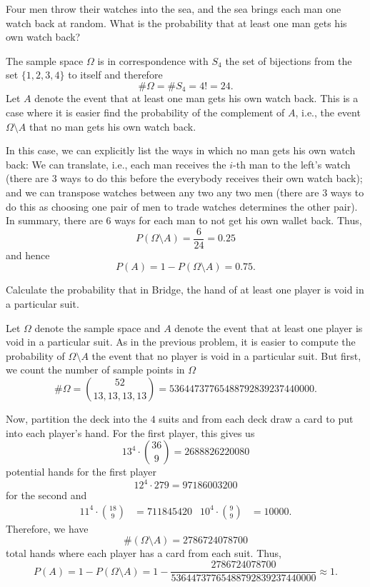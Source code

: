 \begin{problem}[Handout 2, \# 5]
  Four men throw their watches into the sea, and the sea brings each man
  one watch back at random. What is the probability that at least one man
  gets his own watch back?
\end{problem}
\begin{solution}
  The sample space \(\Omega\) is in correspondence with \(S_4\) the set of
  bijections from the set \(\{1,2,3,4\}\) to itself and therefore
  \begin{equation}
    \label{eq:2-1}
    \#\Omega=\# S_4=4!=24.
  \end{equation}
  Let \(A\) denote the event that at least one man gets his own watch
  back. This is a case where it is easier find the probability of the
  complement of \(A\), i.e., the event \(\Omega\setminus A\) that no man
  gets his own watch back.

  In this case, we can explicitly list the ways in which no man gets his
  own watch back: We can translate, i.e., each man receives the \(i\)-th
  man to the left's watch (there are \(3\) ways to do this before the
  everybody receives their own watch back); and we can transpose watches
  between any two any two men (there are \(3\) ways to do this as choosing
  one pair of men to trade watches determines the other pair). In summary,
  there are \(6\) ways for each man to not get his own wallet back. Thus,
  \[
    P(\Omega\setminus A)=\frac{6}{24}=0.25
  \]
  and hence
  \[
    P(A)=1-P(\Omega\setminus A)=0.75.
  \]
\end{solution}
\newpage

\begin{problem}[Handout 2, \#7]
  Calculate the probability that in Bridge, the hand of at least one player
  is void in a particular suit.
\end{problem}
\begin{solution}
  Let \(\Omega\) denote the sample space and \(A\) denote the event that at
  least one player is void in a particular suit. As in the previous
  problem, it is easier to compute the probability of \(\Omega\setminus A\)
  the event that no player is void in a particular suit. But first, we
  count the number of sample points in \(\Omega\)
  \[
    \#\Omega=\binom{52}{13,13,13,13}
    =53644737765488792839237440000.
  \]

  Now, partition the deck into the \(4\) suits and from each deck draw a
  card to put into each player's hand. For the first player, this gives us
  \[
    13^4\cdot\binom{36}{9}=2688826220080
  \]
  potential hands for the first player
  \[
    12^4\cdot{27}{9}=97186003200
  \]
  for the second and
  \begin{align*}
    11^4\cdot\binom{18}{9}&=711845420
    &10^4\cdot\binom{9}{9}&=10000.
  \end{align*}
  Therefore, we have
  \[
    \#(\Omega\setminus A)=2786724078700
  \]
  total hands where each player has a card from each suit. Thus,
  \[
    P(A)=1-P(\Omega\setminus
    A)=1-\frac{2786724078700}{53644737765488792839237440000}\approx 1.
  \]
\end{solution}
\newpage


